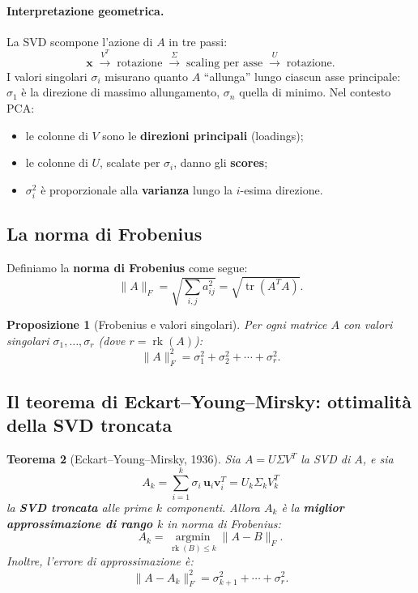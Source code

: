 \documentclass[11pt,a4paper]{article}
\theoremstyle{plain}
\newtheorem{teorema}{Teorema}[section]
\newtheorem{proposizione}[teorema]{Proposizione}
\theoremstyle{definition}
\theoremstyle{remark}
\begin{document}
\paragraph{Interpretazione geometrica.}
La SVD scompone l'azione di $A$ in tre passi:
\[
  \mathbf{x} \;\xrightarrow{V^T}\; \text{rotazione}
  \;\xrightarrow{\Sigma}\; \text{scaling per asse}
  \;\xrightarrow{U}\; \text{rotazione}.
\]
I valori singolari $\sigma_i$ misurano quanto $A$ ``allunga'' lungo ciascun asse
principale: $\sigma_1$ è la direzione di massimo allungamento, $\sigma_n$ quella
di minimo. Nel contesto PCA:
\begin{itemize}
  \item le colonne di $V$ sono le \textbf{direzioni principali} (loadings);
  \item le colonne di $U$, scalate per $\sigma_i$, danno gli \textbf{scores};
  \item $\sigma_i^2$ è proporzionale alla \textbf{varianza} lungo la $i$-esima direzione.
\end{itemize}

\subsection{La norma di Frobenius}

Definiamo la \textbf{norma di Frobenius} come segue:
\[
  \|A\|_F = \sqrt{\sum_{i,j} a_{ij}^2} = \sqrt{\operatorname{tr}(A^T A)}.
\]

\begin{proposizione}[Frobenius e valori singolari]
\label{prop:frob}
Per ogni matrice $A$ con valori singolari $\sigma_1, \ldots, \sigma_r$ (dove
$r = \operatorname{rk}(A)$):
\begin{equation}
  \|A\|_F^2 = \sigma_1^2 + \sigma_2^2 + \cdots + \sigma_r^2.
  \label{eq:frob_svd}
\end{equation}
\end{proposizione}

\subsection{Il teorema di Eckart--Young--Mirsky: ottimalità della SVD troncata}

\begin{teorema}[Eckart--Young--Mirsky, 1936]
\label{thm:ey}
Sia $A = U \Sigma V^T$ la SVD di $A$, e sia
\[
  A_k = \sum_{i=1}^{k} \sigma_i \, \mathbf{u}_i \mathbf{v}_i^T
  = U_k \Sigma_k V_k^T
\]
la \textbf{SVD troncata} alle prime $k$ componenti. Allora $A_k$ è la
\textbf{miglior approssimazione di rango $k$} in norma di Frobenius:
\[
  A_k = \operatorname*{argmin}_{\operatorname{rk}(B) \leq k} \|A - B\|_F.
\]
Inoltre, l'errore di approssimazione è:
\begin{equation}
  \|A - A_k\|_F^2 = \sigma_{k+1}^2 + \cdots + \sigma_r^2.
  \label{eq:ey_errore}
\end{equation}
\end{teorema}
\end{document}
